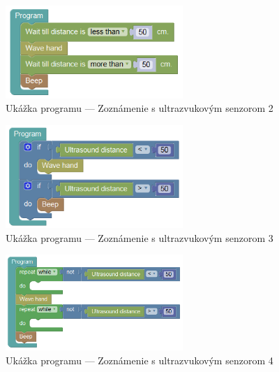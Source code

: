 \begin{figure}
\centerline{\includegraphics[width=0.6\textwidth]{images/example-wave-on-proximity-2}}
\caption[Ukážka programu --- Zoznámenie s ultrazvukovým senzorom 2]{Ukážka programu --- Zoznámenie s ultrazvukovým senzorom 2}
\label{obr:example-wave-on-proximity-2}
\end{figure}

\begin{figure}
\centerline{\includegraphics[width=0.6\textwidth]{images/example-wave-on-proximity-3}}
\caption[Ukážka programu --- Zoznámenie s ultrazvukovým senzorom 3]{Ukážka programu --- Zoznámenie s ultrazvukovým senzorom 3}
\label{obr:example-wave-on-proximity-3}
\end{figure}

\begin{figure}
\centerline{\includegraphics[width=0.6\textwidth]{images/example-wave-on-proximity-4}}
\caption[Ukážka programu --- Zoznámenie s ultrazvukovým senzorom 4]{Ukážka programu --- Zoznámenie s ultrazvukovým senzorom 4}
\label{obr:example-wave-on-proximity-4}
\end{figure}

\newpage

